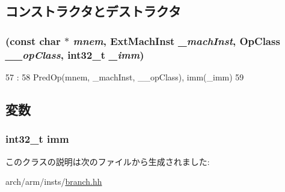 \subsection{コンストラクタとデストラクタ}
\hypertarget{classArmISA_1_1BranchImm_ab6a71217a0ddc2ec12888c65d478c13b}{
\subsubsection[{BranchImm}]{ (const char $\ast$ {\em mnem}, \/  {\bf ExtMachInst} {\em \_\-machInst}, \/  OpClass {\em \_\-\_\-opClass}, \/  int32\_\-t {\em \_\-imm})}}
\label{classArmISA_1_1BranchImm_ab6a71217a0ddc2ec12888c65d478c13b}



\begin{DoxyCode}
57                             :
58         PredOp(mnem, _machInst, __opClass), imm(_imm)
59     {}

\end{DoxyCode}


\subsection{変数}
\hypertarget{classArmISA_1_1BranchImm_a71f011dbd3228d41f9e08aaf8c133f77}{
\subsubsection[{imm}]{\setlength{\rightskip}{0pt plus 5cm}int32\_\-t {\bf imm}}}
\label{classArmISA_1_1BranchImm_a71f011dbd3228d41f9e08aaf8c133f77}


このクラスの説明は次のファイルから生成されました:\begin{DoxyCompactItemize}
\item 
arch/arm/insts/\hyperlink{arm_2insts_2branch_8hh}{branch.hh}\end{DoxyCompactItemize}
